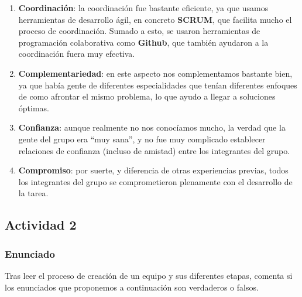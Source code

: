 \begin{enumerate}
\begin{enumerate}
        \item \textbf{Coordinación}: la coordinación fue bastante eficiente, ya que usamos herramientas de desarrollo ágil, en concreto \textbf{SCRUM}, que facilita mucho el proceso de coordinación. Sumado a esto, se usaron herramientas de programación colaborativa como \textbf{Github}, que también ayudaron a la coordinación fuera muy efectiva.

        \item \textbf{Complementariedad}: en este aspecto nos complementamos bastante bien, ya que había gente de diferentes especialidades que tenían diferentes enfoques de como afrontar el mismo problema, lo que ayudo a llegar a soluciones óptimas.

        \item \textbf{Confianza}: aunque realmente no nos conocíamos mucho, la verdad que la gente del grupo era ``muy sana'', y no fue muy complicado establecer relaciones de confianza (incluso de amistad) entre los integrantes del grupo.

        \item \textbf{Compromiso}: por suerte, y diferencia de otras experiencias previas, todos los integrantes del grupo se comprometieron plenamente con el desarrollo de la tarea.
    \end{enumerate}
\end{enumerate}

\subsection{Actividad 2}

\subsubsection{Enunciado}
Tras leer el proceso de creación de un equipo y sus diferentes etapas, comenta si los enunciados que proponemos a continuación son verdaderos o falsos.

